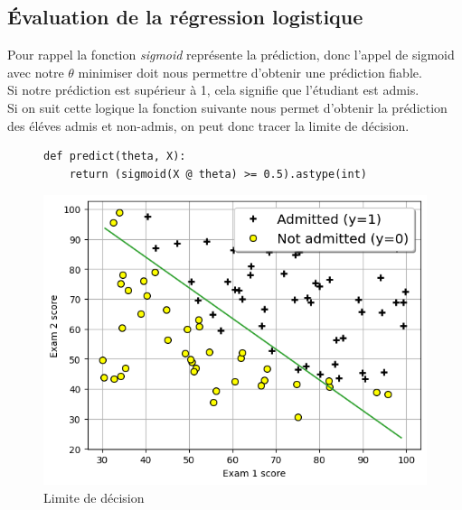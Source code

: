 \subsection{Évaluation de la régression logistique}

Pour rappel la fonction \textit{sigmoid} représente la prédiction, donc l'appel de sigmoid avec notre $\theta$ minimiser doit nous permettre d'obtenir une prédiction fiable.  \\
Si notre prédiction est supérieur à 1, cela signifie que l'étudiant est admis. \\
Si on suit cette logique la fonction suivante nous permet d'obtenir la prédiction des éléves admis et non-admis, on peut donc tracer la limite de décision.


\begin{figure}[!h]
    \begin{minipage}{.40\linewidth}
\begin{verbatim}
def predict(theta, X):
    return (sigmoid(X @ theta) >= 0.5).astype(int)
\end{verbatim}   
    \end{minipage}\hfill
    \begin{minipage}{.56\linewidth}
        \begin{center}
            \includegraphics[width=1\textwidth]{./img/3.2.png}
            \caption{\label{fig:3.2}Limite de décision}  
        \end{center}
    \end{minipage}
\end{figure}